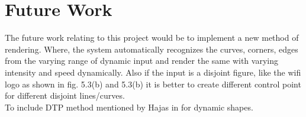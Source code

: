 %

\chapter{Future Work}
\label{sec:futurework}
The future work relating to this project would be to implement a new method of 
rendering. Where, the system automatically recognizes the curves, corners, 
edges from the varying range of dynamic input and render the same with varying 
intensity and speed dynamically. Also if the input 
is a disjoint figure, like the wifi logo as shown in fig. 5.3(b) and 5.3(b) it is 
better to create different control point for different disjoint lines/curves.\\
To include DTP method mentioned by Hajas in \cite{Hajas2020} for dynamic shapes.
